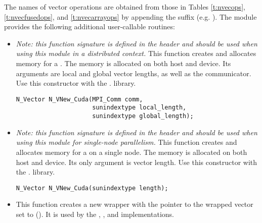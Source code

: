 The names of vector operations are obtained from those in Tables \ref{t:nvecops},
\ref{t:nvecfusedops}, and \ref{t:nvecarrayops} by appending the suffix 
(e.g. ).
The module {\nveccuda}  provides the following additional user-callable routines:
\begin{itemize}



\item {}

  \textit{Note: this function signature is defined in the header 
    and should be used when using this module in a distributed context.}
  This function creates and allocates memory for a {\cuda} .
  The memory is allocated on both host and device. Its arguments are local
  and global vector lengths, as well as the {\mpi} communicator. Use this 
  constructor with the . library.

\begin{verbatim}
N_Vector N_VNew_Cuda(MPI_Comm comm,
                     sunindextype local_length,
                     sunindextype global_length);
\end{verbatim}



\item {}

  \textit{Note: this function signature is defined in the header 
    and should be used when using this module for single-node parallelism.}
  This function creates and allocates memory for a {\cuda} 
  on a single node. The memory is allocated on both host and device.
  Its only argument is vector length. Use this constructor with the 
  . library.

\begin{verbatim}
N_Vector N_VNew_Cuda(sunindextype length);
\end{verbatim}



\item {}

  This function creates a new {\nvector} wrapper with the pointer to
  the wrapped {\cuda} vector set to (). It is used by the
  , , and 
  implementations.


\end{itemize}
